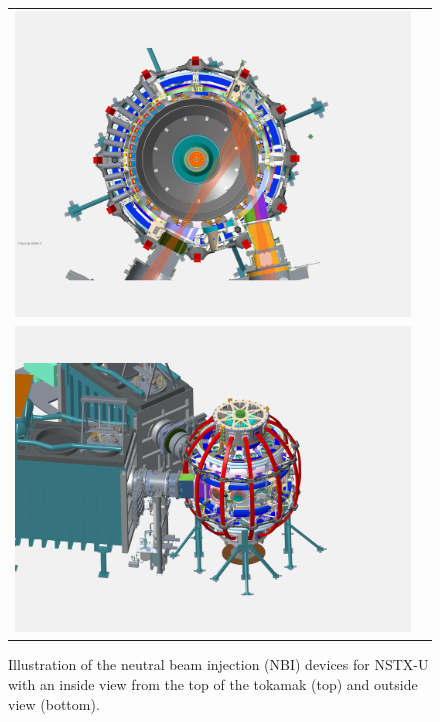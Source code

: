 \documentclass[12pt,lot, lof]{puthesis}
\begin{document}
\begin{figure}
\centering
\begin{tabular}{cc}
\includegraphics[width=0.7 \linewidth]{fig3a} \\
\includegraphics[width=0.7\linewidth]{fig3b}
\end{tabular}
\caption{Illustration of the neutral beam injection (NBI) devices for NSTX-U with an inside view from the top of the tokamak (top) and outside view (bottom).}
\label{NBI_pics}
\end{figure}
\end{document}
